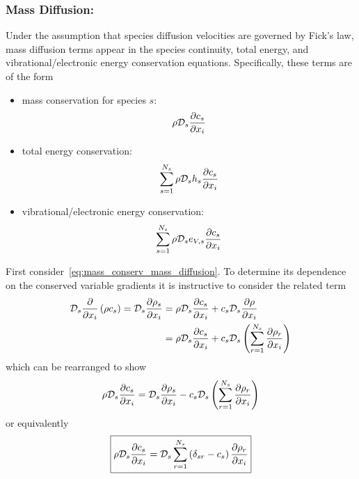 \subsubsection*{Mass Diffusion:} Under the assumption that species diffusion velocities are governed by Fick's law, mass diffusion terms appear in the species continuity, total energy, and vibrational/electronic energy conservation equations.  Specifically, these terms are of the form
\begin{itemize}
  \item mass conservation for species $s$:
    \begin{equation}
      \label{eq:mass_conserv_mass_diffusion}
      \rho \mathcal{D}_s {\frac{\partial{c_s}}{\partial{x_i}}}
    \end{equation}
  \item total energy conservation:
    \begin{equation}
      \label{eq:tot_energy_conserv_mass_diffusion}
      \sum_{s=1}^{N_s} \rho \mathcal{D}_s h_s{\frac{\partial{c_s}}{\partial{x_i}}}
    \end{equation}
  \item vibrational/electronic energy conservation:
    \begin{equation}
      \label{eq:vib_energy_conserv_mass_diffusion}
      \sum_{s=1}^{N_s} \rho \mathcal{D}_s e_{V,s}{\frac{\partial{c_s}}{\partial{x_i}}}
    \end{equation}
\end{itemize}
First consider~\eqref{eq:mass_conserv_mass_diffusion}. To determine its dependence on the conserved variable gradients it is instructive to consider the related term 
\begin{align*}
  \mathcal{D}_s{\frac{\partial{}}{\partial{x_i}}}\left(\rho c_s\right) = 
    \mathcal{D}_s{\frac{\partial{\rho_s}}{\partial{x_i}}} 
      &= \rho \mathcal{D}_s{\frac{\partial{c_s}}{\partial{x_i}}} + c_s \mathcal{D}_s {\frac{\partial{\rho}}{\partial{x_i}}} \\
      &= \rho \mathcal{D}_s{\frac{\partial{c_s}}{\partial{x_i}}} + c_s \mathcal{D}_s\left(\sum_{r=1}^{N_s} {\frac{\partial{\rho_r}}{\partial{x_i}}}\right)
\end{align*}
which can be rearranged to show
\begin{equation*}
  \rho \mathcal{D}_s{\frac{\partial{c_s}}{\partial{x_i}}} = \mathcal{D}_s{\frac{\partial{\rho_s}}{\partial{x_i}}} - c_s \mathcal{D}_s\left(\sum_{r=1}^{N_s} {\frac{\partial{\rho_r}}{\partial{x_i}}}\right)
\end{equation*}
or equivalently
\begin{equation}
  \boxed{\rho \mathcal{D}_s{\frac{\partial{c_s}}{\partial{x_i}}} = \mathcal{D}_s \sum_{r=1}^{N_s} \left(\delta_{sr} - c_s\right) {\frac{\partial{\rho_r}}{\partial{x_i}}}}
\end{equation}
